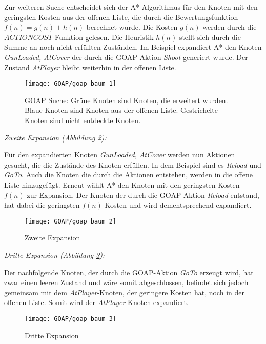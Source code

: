 Zur weiteren Suche entscheidet sich der A*-Algorithmus f\"{u}r den Knoten mit den geringsten Kosten aus der offenen Liste, die durch die Bewertungsfunktion $f(n) = g(n) + h(n)$ berechnet wurde. Die Kosten $g(n)$ werden durch die $\textit{ACTIONCOST}$-Funktion gelesen. Die Heuristik $h(n)$ stellt sich durch die Summe an noch nicht erf\"{u}llten Zust\"{a}nden. Im Beispiel expandiert A* den Knoten \textit{GunLoaded, AtCover} der durch die GOAP-Aktion \textit{Shoot} generiert wurde. Der Zustand \textit{AtPlayer} bleibt weiterhin in der offenen Liste.


\begin{figure}[h]
  \centering
  \texttt{[image: GOAP/goap baum 1]}
	\captionsetup{justification=justified, format=plain}
  \caption{GOAP Suche: Gr\"{u}ne Knoten sind Knoten, die erweitert wurden. Blaue Knoten sind Knoten aus der offenen Liste. Gestrichelte Knoten sind nicht entdeckte Knoten.}
  \label{fig:goap1}
\end{figure}

\clearpage

\textit{Zweite Expansion (Abbildung \ref{fig:goap2}):}

F\"{u}r den expandierten Knoten \textit{GunLoaded, AtCover} werden nun Aktionen gesucht, die die Zust\"{a}nde des Knoten erf\"{u}llen. In dem Beispiel sind es \textit{Reload} und \textit{GoTo}. Auch die Knoten die durch die Aktionen entstehen, werden in die offene Liste hinzugef\"{u}gt. Erneut w\"{a}hlt A* den Knoten mit den geringsten Kosten $f(n)$ zur Expansion. Der Knoten der durch die GOAP-Aktion \textit{Reload} entstand, hat dabei die geringsten $f(n)$ Kosten und wird dementsprechend expandiert. 


\begin{figure}[ht]
  \centering
  \texttt{[image: GOAP/goap baum 2]}
	\captionsetup{justification=justified, format=plain}
  \caption{Zweite Expansion}
  \label{fig:goap2}
\end{figure}


\clearpage

\textit{Dritte Expansion (Abbildung \ref{fig:goap3}):}

Der nachfolgende Knoten, der durch die GOAP-Aktion \textit{GoTo} erzeugt wird, hat zwar einen leeren Zustand und w\"{a}re somit abgeschlossen, befindet sich jedoch gemeinsam mit dem \textit{AtPlayer}-Knoten, der geringere Kosten hat, noch in der offenen Liste. Somit wird der \textit{AtPlayer}-Knoten expandiert.

\begin{figure}[h]
  \centering
  \texttt{[image: GOAP/goap baum 3]}
	\captionsetup{justification=justified, format=plain}
  \caption{Dritte Expansion}
  \label{fig:goap3}
\end{figure}

